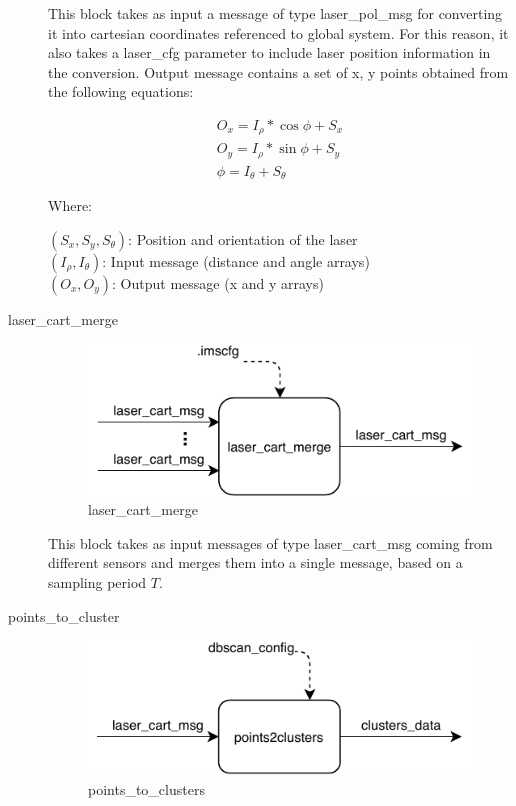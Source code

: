 \begin{description}
This block takes as input a message of type laser\_pol\_msg for converting it into cartesian coordinates referenced to global system. For this reason, it also takes a laser\_cfg parameter to include laser position information in the conversion. Output message contains a set of x, y points obtained from the following equations:

\begin{eqnarray*}
O_x = I_\rho*\cos{\phi}+S_x \\
O_y = I_\rho*\sin{\phi} + S_y \\
\phi = I_\theta + S_\theta
\end{eqnarray*}

Where:

$(S_x, S_y, S_\theta)$: Position and orientation of the laser \\
$(I_\rho, I_\theta )$: Input message (distance and angle arrays) \\
$(O_x, O_y )$: Output message (x and y arrays) \\


\item[laser\_cart\_merge] \hfill

\begin{figure}[ht!]
\centering
\includegraphics[scale=0.8]{fig/3/laser_cart_merge.pdf}
\caption{laser\_cart\_merge}
\label{laser_cart_merge}
\end{figure}

This block takes as input messages of type laser\_cart\_msg coming from different sensors and merges them into a single message, based on a sampling period $T$.

\item[points\_to\_cluster] \hfill

\begin{figure}[ht!]
\centering
\includegraphics[scale=0.8]{fig/3/points_to_clusters.pdf}
\caption{points\_to\_clusters}
\label{points_to_clusters}
\end{figure}


\end{description}
